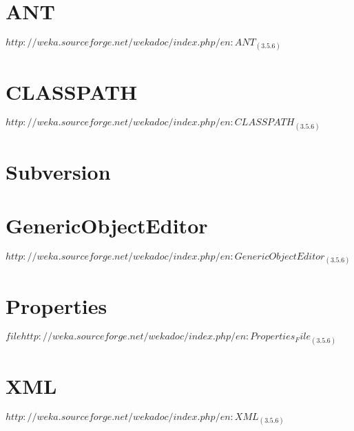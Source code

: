 
\section{ANT}
$http://weka.sourceforge.net/wekadoc/index.php/en:ANT_(3.5.6)$

\section{CLASSPATH}
$http://weka.sourceforge.net/wekadoc/index.php/en:CLASSPATH_(3.5.6)$

\section{Subversion}

\section{GenericObjectEditor}
$http://weka.sourceforge.net/wekadoc/index.php/en:GenericObjectEditor_(3.5.6)$

\section{Properties}
$file http://weka.sourceforge.net/wekadoc/index.php/en:Properties_File_(3.5.6)$

\section{XML}
$http://weka.sourceforge.net/wekadoc/index.php/en:XML_(3.5.6)$
